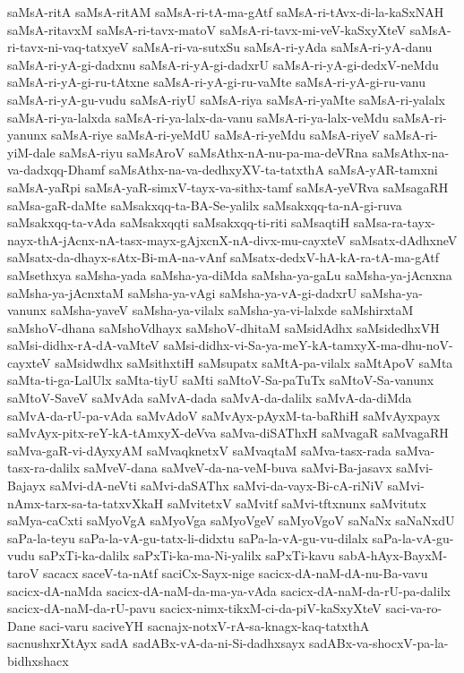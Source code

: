 {saMsA-ritA
saMsA-ritAM
saMsA-ri-tA-ma-gAtf
saMsA-ri-tAvx-di-la-kaSxNAH
saMsA-ritavxM
saMsA-ri-tavx-matoV
saMsA-ri-tavx-mi-veV-kaSxyXteV
saMsA-ri-tavx-ni-vaq-tatxyeV
saMsA-ri-va-sutxSu
saMsA-ri-yAda
saMsA-ri-yA-danu
saMsA-ri-yA-gi-dadxnu
saMsA-ri-yA-gi-dadxrU
saMsA-ri-yA-gi-dedxV-neMdu
saMsA-ri-yA-gi-ru-tAtxne
saMsA-ri-yA-gi-ru-vaMte
saMsA-ri-yA-gi-ru-vanu
saMsA-ri-yA-gu-vudu
saMsA-riyU
saMsA-riya
saMsA-ri-yaMte
saMsA-ri-yalalx
saMsA-ri-ya-lalxda
saMsA-ri-ya-lalx-da-vanu
saMsA-ri-ya-lalx-veMdu
saMsA-ri-yanunx
saMsA-riye
saMsA-ri-yeMdU
saMsA-ri-yeMdu
saMsA-riyeV
saMsA-ri-yiM-dale
saMsA-riyu
saMsAroV
saMsAthx-nA-nu-pa-ma-deVRna
saMsAthx-na-va-dadxqq-Dhamf
saMsAthx-na-va-dedhxyXV-ta-tatxthA
saMsA-yAR-tamxni
saMsA-yaRpi
saMsA-yaR-simxV-tayx-va-sithx-tamf
saMsA-yeVRva
saMsagaRH
saMsa-gaR-daMte
saMsakxqq-ta-BA-Se-yalilx
saMsakxqq-ta-nA-gi-ruva
saMsakxqq-ta-vAda
saMsakxqqti
saMsakxqq-ti-riti
saMsaqtiH
saMsa-ra-tayx-nayx-thA-jAcnx-nA-tasx-mayx-gAjxcnX-nA-divx-mu-cayxteV
saMsatx-dAdhxneV
saMsatx-da-dhayx-sAtx-Bi-mA-na-vAnf
saMsatx-dedxV-hA-kA-ra-tA-ma-gAtf
saMsethxya
saMsha-yada
saMsha-ya-diMda
saMsha-ya-gaLu
saMsha-ya-jAcnxna
saMsha-ya-jAcnxtaM
saMsha-ya-vAgi
saMsha-ya-vA-gi-dadxrU
saMsha-ya-vanunx
saMsha-yaveV
saMsha-ya-vilalx
saMsha-ya-vi-lalxde
saMshirxtaM
saMshoV-dhana
saMshoVdhayx
saMshoV-dhitaM
saMsidAdhx
saMsidedhxVH
saMsi-didhx-rA-dA-vaMteV
saMsi-didhx-vi-Sa-ya-meY-kA-tamxyX-ma-dhu-noV-cayxteV
saMsidwdhx
saMsithxtiH
saMsupatx
saMtA-pa-vilalx
saMtApoV
saMta
saMta-ti-ga-LalUlx
saMta-tiyU
saMti
saMtoV-Sa-paTuTx
saMtoV-Sa-vanunx
saMtoV-SaveV
saMvAda
saMvA-dada
saMvA-da-dalilx
saMvA-da-diMda
saMvA-da-rU-pa-vAda
saMvAdoV
saMvAyx-pAyxM-ta-baRhiH
saMvAyxpayx
saMvAyx-pitx-reY-kA-tAmxyX-deVva
saMva-diSAThxH
saMvagaR
saMvagaRH
saMva-gaR-vi-dAyxyAM
saMvaqknetxV
saMvaqtaM
saMva-tasx-rada
saMva-tasx-ra-dalilx
saMveV-dana
saMveV-da-na-veM-buva
saMvi-Ba-jasavx
saMvi-Bajayx
saMvi-dA-neVti
saMvi-daSAThx
saMvi-da-vayx-Bi-cA-riNiV
saMvi-nAmx-tarx-sa-ta-tatxvXkaH
saMvitetxV
saMvitf
saMvi-tftxnunx
saMvitutx
saMya-caCxti
saMyoVgA
saMyoVga
saMyoVgeV
saMyoVgoV
saNaNx
saNaNxdU
saPa-la-teyu
saPa-la-vA-gu-tatx-li-didxtu
saPa-la-vA-gu-vu-dilalx
saPa-la-vA-gu-vudu
saPxTi-ka-dalilx
saPxTi-ka-ma-Ni-yalilx
saPxTi-kavu
sabA-hAyx-BayxM-taroV
sacacx
saceV-ta-nAtf
saciCx-Sayx-nige
sacicx-dA-naM-dA-nu-Ba-vavu
sacicx-dA-naMda
sacicx-dA-naM-da-ma-ya-vAda
sacicx-dA-naM-da-rU-pa-dalilx
sacicx-dA-naM-da-rU-pavu
sacicx-nimx-tikxM-ci-da-piV-kaSxyXteV
saci-va-ro-Dane
saci-varu
saciveYH
sacnajx-notxV-rA-sa-knagx-kaq-tatxthA
sacnushxrXtAyx
sadA
sadABx-vA-da-ni-Si-dadhxsayx
sadABx-va-shocxV-pa-la-bidhxshacx
}
